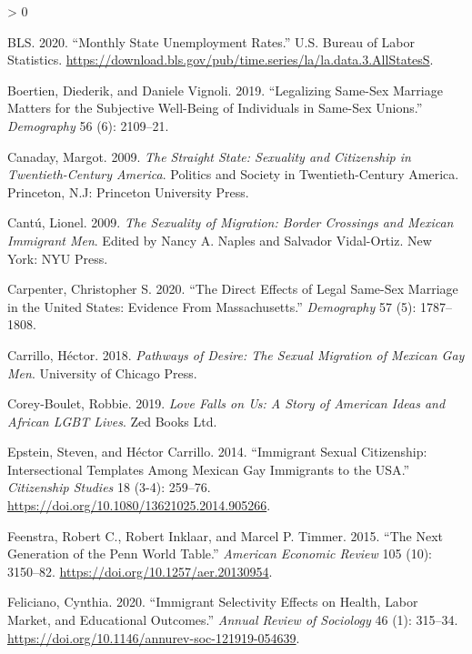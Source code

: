 \documentclass[
  11pt,
]{article}
\newlength{\cslhangindent}
\newenvironment{CSLReferences}[2] %
 {%
  \setlength{\parindent}{0pt}
  \ifodd #1 \everypar{\setlength{\hangindent}{\cslhangindent}}\ignorespaces\fi
  \ifnum #2 > 0
  \setlength{\parskip}{#2\baselineskip}
  \fi
 }%
 {}
\begin{document}
\begin{CSLReferences}{1}{0}
\leavevmode\hypertarget{ref-bls_2020}{}%
BLS. 2020. {``Monthly State Unemployment Rates.''} U.S. Bureau of Labor Statistics. \url{https://download.bls.gov/pub/time.series/la/la.data.3.AllStatesS}.

\leavevmode\hypertarget{ref-boertien_2019}{}%
Boertien, Diederik, and Daniele Vignoli. 2019. {``Legalizing Same-Sex Marriage Matters for the Subjective Well-Being of Individuals in Same-Sex Unions.''} \emph{Demography} 56 (6): 2109--21.

\leavevmode\hypertarget{ref-canaday_2009}{}%
Canaday, Margot. 2009. \emph{The Straight State: Sexuality and Citizenship in Twentieth-Century {America}}. Politics and Society in Twentieth-Century {America}. Princeton, N.J: Princeton University Press.

\leavevmode\hypertarget{ref-cantu_2009}{}%
Cantú, Lionel. 2009. \emph{The {Sexuality} of {Migration}: {Border} {Crossings} and {Mexican} {Immigrant} {Men}}. Edited by Nancy A. Naples and Salvador Vidal-Ortiz. New York: NYU Press.

\leavevmode\hypertarget{ref-carpenter_2020}{}%
Carpenter, Christopher S. 2020. {``The {Direct} {Effects} of {Legal} {Same}-{Sex} {Marriage} in the {United} {States}: {Evidence} {From} {Massachusetts}.''} \emph{Demography} 57 (5): 1787--1808.

\leavevmode\hypertarget{ref-carrillo_2018}{}%
Carrillo, Héctor. 2018. \emph{Pathways of {Desire}: {The} {Sexual} {Migration} of {Mexican} {Gay} {Men}}. University of Chicago Press.

\leavevmode\hypertarget{ref-corey-boulet_2019}{}%
Corey-Boulet, Robbie. 2019. \emph{Love {Falls} on {Us}: A Story of {American} Ideas and {African} {LGBT} Lives}. Zed Books Ltd.

\leavevmode\hypertarget{ref-epstein_2014}{}%
Epstein, Steven, and Héctor Carrillo. 2014. {``Immigrant Sexual Citizenship: Intersectional Templates Among {Mexican} Gay Immigrants to the {USA}.''} \emph{Citizenship Studies} 18 (3-4): 259--76. \url{https://doi.org/10.1080/13621025.2014.905266}.

\leavevmode\hypertarget{ref-feenstra_2015}{}%
Feenstra, Robert C., Robert Inklaar, and Marcel P. Timmer. 2015. {``The {Next} {Generation} of the {Penn} {World} {Table}.''} \emph{American Economic Review} 105 (10): 3150--82. \url{https://doi.org/10.1257/aer.20130954}.

\leavevmode\hypertarget{ref-feliciano_2020}{}%
Feliciano, Cynthia. 2020. {``Immigrant {Selectivity} {Effects} on {Health}, {Labor} {Market}, and {Educational} {Outcomes}.''} \emph{Annual Review of Sociology} 46 (1): 315--34. \url{https://doi.org/10.1146/annurev-soc-121919-054639}.


\end{CSLReferences}
\end{document}
